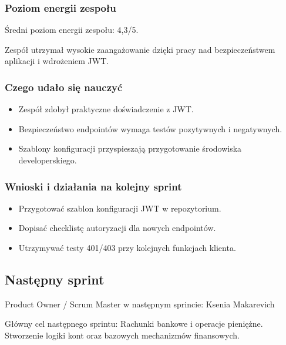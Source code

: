 \documentclass[12pt,a4paper]{article}
\begin{document}
\subsubsection*{Poziom energii zespołu}
Średni poziom energii zespołu: 4,3/5.

Zespół utrzymał wysokie zaangażowanie dzięki pracy nad bezpieczeństwem aplikacji i wdrożeniem JWT.

\subsubsection*{Czego udało się nauczyć}
\begin{itemize}
\item Zespół zdobył praktyczne doświadczenie z JWT.
\item Bezpieczeństwo endpointów wymaga testów pozytywnych i negatywnych.
\item Szablony konfiguracji przyspieszają przygotowanie środowiska developerskiego.
\end{itemize}
\subsubsection*{Wnioski i działania na kolejny sprint}
\begin{itemize}
\item Przygotować szablon konfiguracji JWT w repozytorium.
\item Dopisać checklistę autoryzacji dla nowych endpointów.
\item Utrzymywać testy 401/403 przy kolejnych funkcjach klienta.
\end{itemize}

\subsection*{Następny sprint}
Product Owner / Scrum Master w następnym sprincie: Ksenia Makarevich

Główny cel następnego sprintu: Rachunki bankowe i operacje pieniężne. Stworzenie logiki kont oraz bazowych mechanizmów finansowych.
\end{document}
